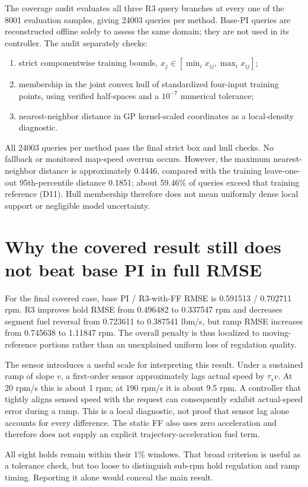 The coverage audit evaluates all three R3 query branches at every one of the 8001 evaluation samples, giving 24003 queries per method. Base-PI queries are reconstructed offline solely to assess the same domain; they are not used in its controller. The audit separately checks:
\begin{enumerate}
\item strict componentwise training bounds, $x_j\in[\min_i x_{ij},\max_i x_{ij}]$;
\item membership in the joint convex hull of standardized four-input training points, using verified half-spaces and a $10^{-7}$ numerical tolerance;
\item nearest-neighbor distance in GP kernel-scaled coordinates as a local-density diagnostic.
\end{enumerate}
All 24003 queries per method pass the final strict box and hull checks. No fallback or monitored map-speed overrun occurs. However, the maximum nearest-neighbor distance is approximately 0.4446, compared with the training leave-one-out 95th-percentile distance 0.1851; about 59.46\% of queries exceed that training reference (D11). Hull membership therefore does not mean uniformly dense local support or negligible model uncertainty.

\section{Why the covered result still does not beat base PI in full RMSE}
For the final covered case, base PI / R3-with-FF RMSE is 0.591513 / 0.702711 rpm. R3 improves hold RMSE from 0.496482 to 0.337547 rpm and decreases segment fuel reversal from 0.723611 to 0.387541 lbm/s, but ramp RMSE increases from 0.745638 to 1.11847 rpm. The overall penalty is thus localized to moving-reference portions rather than an unexplained uniform loss of regulation quality.

The sensor introduces a useful scale for interpreting this result. Under a sustained ramp of slope $v$, a first-order sensor approximately lags actual speed by $\tau_sv$. At 20 rpm/s this is about 1 rpm; at 190 rpm/s it is about 9.5 rpm. A controller that tightly aligns sensed speed with the request can consequently exhibit actual-speed error during a ramp. This is a local diagnostic, not proof that sensor lag alone accounts for every difference. The static FF also uses zero acceleration and therefore does not supply an explicit trajectory-acceleration fuel term.

All eight holds remain within their 1\% windows. That broad criterion is useful as a tolerance check, but too loose to distinguish sub-rpm hold regulation and ramp timing. Reporting it alone would conceal the main result.


